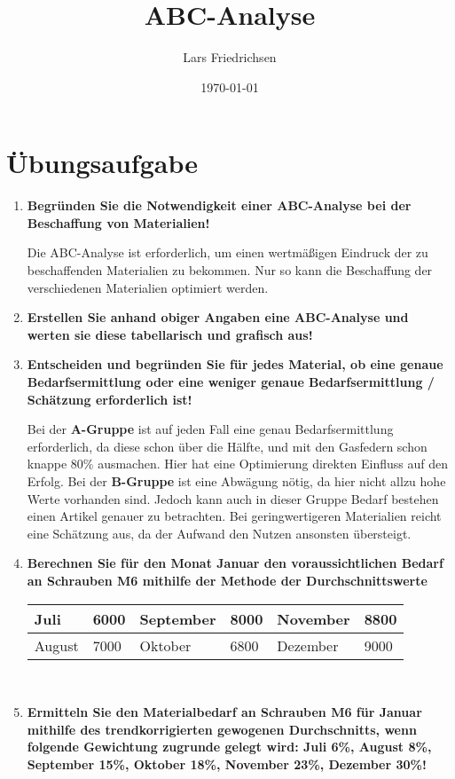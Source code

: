 \documentclass[a4paper,11pt]{scrartcl}	%
\title{ABC-Analyse}
\author{Lars Friedrichsen}
\date{\today}
\begin{document}
\section{Übungsaufgabe}

	\begin{enumerate}
		\item \textbf{Begründen Sie die Notwendigkeit einer ABC-Analyse bei der Beschaffung von Materialien!}\par
		Die ABC-Analyse ist erforderlich, um einen wertmäßigen Eindruck der zu beschaffenden Materialien zu bekommen.
		Nur so kann die Beschaffung der verschiedenen Materialien optimiert werden.  
		\item \textbf{Erstellen Sie anhand obiger Angaben eine ABC-Analyse und werten sie diese tabellarisch und grafisch aus!}
		\item \textbf{Entscheiden und begründen Sie für jedes Material, ob eine genaue Bedarfsermittlung oder eine weniger
		genaue Bedarfsermittlung / Schätzung erforderlich ist!}\par
		Bei der \textbf{A-Gruppe} ist auf jeden Fall eine genau Bedarfsermittlung erforderlich, da diese schon
		über die Hälfte, und mit den Gasfedern schon knappe 80\% ausmachen. Hier hat eine Optimierung direkten
		Einfluss auf den Erfolg.
		Bei der \textbf{B-Gruppe} ist eine Abwägung nötig, da hier nicht allzu hohe Werte vorhanden sind. Jedoch 
		kann auch in dieser Gruppe Bedarf bestehen einen Artikel genauer zu betrachten. Bei geringwertigeren 
		Materialien reicht eine Schätzung aus, da der Aufwand den Nutzen ansonsten übersteigt.   
		\item  \textbf{Berechnen Sie für den Monat Januar den voraussichtlichen Bedarf an Schrauben M6 mithilfe
		der Methode der Durchschnittswerte}\par
			\begin{tabular}{|l|l|l|l|l|l|}
				\hline
				Juli	&	6000	&	September	&	8000	&	November	&	8800\\ \hline
				August	&	7000	&	Oktober		&	6800	&	Dezember	&	9000\\ \hline
			\end{tabular}\\[0.5cm]
			
		\item \textbf{Ermitteln Sie den Materialbedarf an Schrauben M6 für Januar mithilfe des trendkorrigierten
		gewogenen Durchschnitts, wenn folgende Gewichtung zugrunde gelegt wird: Juli 6\%, August 8\%, September 15\%,
		Oktober 18\%, November 23\%, Dezember 30\%!}
	\end{enumerate}
\end{document}

